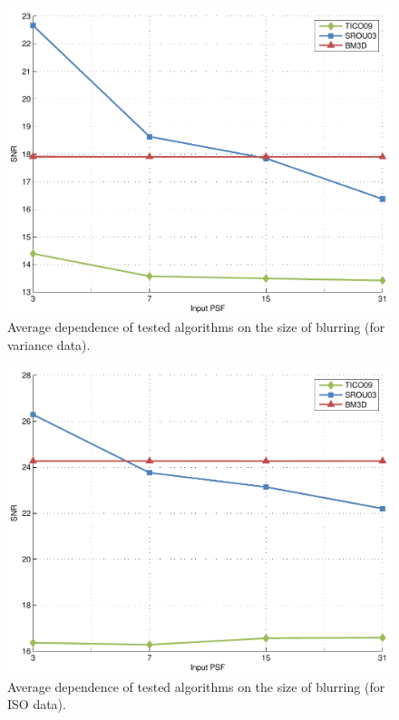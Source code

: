 \documentclass[12pt,notitlepage]{report}
\begin{document}
\begin{figure}[htb]
 \centering
  \includegraphics[width=12cm]{avg_methods_vs_var_psf_size.pdf}
 \caption{Average dependence of tested algorithms on the size of blurring (for variance data).}
 \label{fig:avg_methods_vs_psf_size}
\end{figure}

\begin{figure}[htb]
 \centering
  \includegraphics[width=12cm]{avg_methods_vs_ISO_psf_size.pdf}
 \caption{Average dependence of tested algorithms on the size of blurring (for ISO data).}
 \label{fig:avg_methods_vs_ISO_psf_size}
\end{figure}
\end{document}

